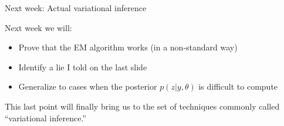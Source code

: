 \begin{frame}{Next week: Actual variational inference}

Next week we will:

\begin{itemize}
    \item Prove that the EM algorithm works (in a non-standard way)
    \item Identify a lie I told on the last slide
    \item Generalize to cases when the posterior
        $p(z | y, \theta)$ is difficult to compute
\end{itemize}

This last point will finally bring us to the set of techniques commonly called
``variational inference.''

\end{frame}
